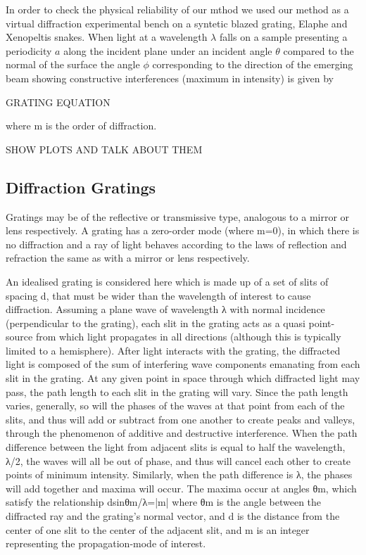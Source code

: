 In order to check the physical reliability of our mthod we used our method as a virtual diffraction experimental bench on a syntetic blazed grating, Elaphe and Xenopeltis snakes. When light at a wavelength $\lambda$ falls on a sample presenting a periodicity $a$ along the incident plane under an incident angle $\theta$ compared to the normal of the surface the angle $\phi$ corresponding to the direction of the emerging beam showing constructive interferences (maximum in intensity) is given by

GRATING EQUATION

where m is the order of diffraction. 

SHOW PLOTS AND TALK ABOUT THEM


\subsection{Diffraction Gratings}
Gratings may be of the reflective or transmissive type, analogous to a mirror or lens respectively. A grating has a zero-order mode (where m=0), in which there is no diffraction and a ray of light behaves according to the laws of reflection and refraction the same as with a mirror or lens respectively.

An idealised grating is considered here which is made up of a set of slits of spacing d, that must be wider than the wavelength of interest to cause diffraction. Assuming a plane wave of wavelength λ with normal incidence (perpendicular to the grating), each slit in the grating acts as a quasi point-source from which light propagates in all directions (although this is typically limited to a hemisphere). After light interacts with the grating, the diffracted light is composed of the sum of interfering wave components emanating from each slit in the grating. At any given point in space through which diffracted light may pass, the path length to each slit in the grating will vary. Since the path length varies, generally, so will the phases of the waves at that point from each of the slits, and thus will add or subtract from one another to create peaks and valleys, through the phenomenon of additive and destructive interference. When the path difference between the light from adjacent slits is equal to half the wavelength, λ/2, the waves will all be out of phase, and thus will cancel each other to create points of minimum intensity. Similarly, when the path difference is λ, the phases will add together and maxima will occur. The maxima occur at angles θm, which satisfy the relationship dsinθm/λ=|m| where θm is the angle between the diffracted ray and the grating's normal vector, and d is the distance from the center of one slit to the center of the adjacent slit, and m is an integer representing the propagation-mode of interest.


